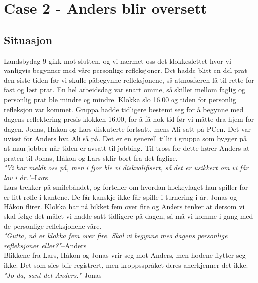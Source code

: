 \section{Case 2 - Anders blir oversett }

\subsection{Situasjon}

 Landsbydag 9 gikk mot slutten, og vi nærmet oss det klokkeslettet hvor vi vanligvis begynner med våre personlige refleksjoner. Det hadde blitt en del prat den siste tiden før vi skulle påbegynne refleksjonene, så atmosfæren lå til rette for fast og løst prat. En hel arbeidsdag var snart omme, så skillet mellom faglig og personlig prat ble mindre og mindre. Klokka slo 16.00 og tiden for personlig refleksjon var kommet. Gruppa hadde tidligere bestemt seg for å begynne med dagens reflektering presis klokken 16.00, for å få nok tid før vi måtte dra hjem for dagen. Jonas, Håkon og Lars diskuterte fortsatt, mens Ali satt på PCen. Det var uvisst for Anders hva Ali så på. Det er en generell tillit i gruppa som bygger på at man jobber når tiden er avsatt til jobbing. Til tross for dette hører Anders at praten til Jonas, Håkon og Lars sklir bort fra det faglige. \\

\textit{"Vi har meldt oss på, men i fjor ble vi diskvalifisert, så det er usikkert om vi får lov i år."}{--Lars}\\

Lars trekker på smilebåndet, og forteller om hvordan hockeylaget han spiller for er litt røffe i kantene. De får kanskje ikke får spille i turnering i år. Jonas og Håkon flirer. Klokka har nå bikket fem over fire og Anders tenker at dersom vi skal følge det målet vi hadde satt tidligere på dagen, så må vi komme i gang med de personlige refleksjonene våre.\\

\textit{"Gutta, nå er klokka fem over fire. Skal vi begynne med dagens personlige refleksjoner eller?"}{--Anders}\\

Blikkene fra Lars, Håkon og Jonas vrir seg mot Anders, men hodene flytter seg ikke. Det som sies blir registrert, men kroppsspråket deres anerkjenner det ikke.\\

\textit{"Jo da, sant det Anders."}{--Jonas}\\


